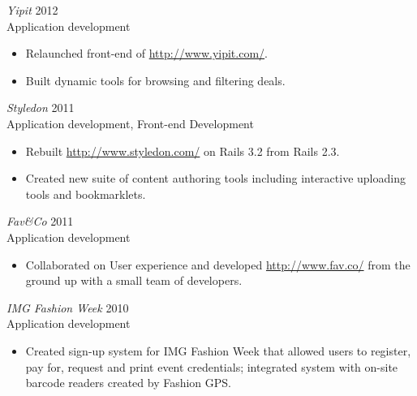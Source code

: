 \documentclass[line,margin]{res}
\begin{document}
\begin{resume}
\begin{samepage}
\begin{itemize}
    \end{itemize}
    \end{samepage}


    \begin{samepage}
    {\sl Yipit}
    \hfill 2012 \\
    Application development
    \begin{itemize} \itemsep -2pt
        \item
            Relaunched front-end of \url{http://www.yipit.com/}.

        \item
            Built dynamic tools for browsing and filtering deals.

    \end{itemize}
    \end{samepage}

    {\sl Styledon}
    \hfill 2011 \\
    Application development, Front-end Development
    \begin{itemize} \itemsep -2pt
        \item
            Rebuilt \url{http://www.styledon.com/} on Rails 3.2 from Rails
            2.3.

        \item
            Created new suite of content authoring tools including interactive
            uploading tools and bookmarklets.

    \end{itemize}

    {\sl Fav\&Co}
    \hfill 2011 \\
    Application development
    \begin{itemize} \itemsep -2pt
        \item
            Collaborated on User experience and developed
            \url{http://www.fav.co/} from the ground up with a small team of
            developers.

    \end{itemize}

    {\sl IMG Fashion Week}
    \hfill 2010 \\
    Application development
    \begin{itemize} \itemsep -2pt
        \item
            Created sign-up system for IMG Fashion Week that allowed users to
            register, pay for, request and print event credentials; integrated
            system with on-site barcode readers created by Fashion GPS.


\end{itemize}
\end{resume}
\end{document}
